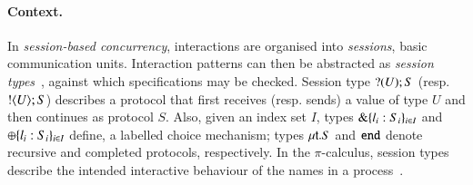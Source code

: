 \documentclass[runningheads]{llncs}
\begin{document}
\paragraph{Context.}
In \emph{session-based concurrency}, interactions are organised into \emph{sessions}, basic communication units.
Interaction patterns can then be abstracted as \emph{session types}~\cite{honda.vasconcelos.kubo:language-primitives}, against which  specifications may be checked. 
Session type $? (U) ; S$ (resp.  $! \langle U \rangle ; S$)
describes a protocol that first receives (resp. sends) a value of type $U$ and then continues as protocol $S$.
Also, given an index set $I$, types $\& \{l_i:S_i\}_{i \in I}$ 
and $\oplus \{l_i:S_i\}_{i \in I}$ 
define, %
 a labelled choice mechanism; types 
$\mu\mathsf{t}.S$ 
and 
$\mathtt{end}$ denote recursive and completed protocols, respectively.
In the %
$\pi$-calculus, %
session types describe the intended interactive behaviour of the names %
in a process~\cite{honda.vasconcelos.kubo:language-primitives}.
\end{document}
